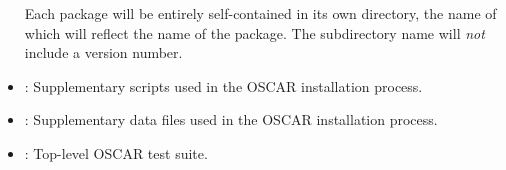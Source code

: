 \begin{itemize}
  Each package will be entirely self-contained in its own directory,
  the name of which will reflect the name of the package.  The
  subdirectory name will {\em not} include a version number.
  
\item {}: Supplementary scripts used in the OSCAR
  installation process.
  
\item {}: Supplementary data files used in the OSCAR
  installation process.
  
\item {}: Top-level OSCAR test suite.
\end{itemize}

